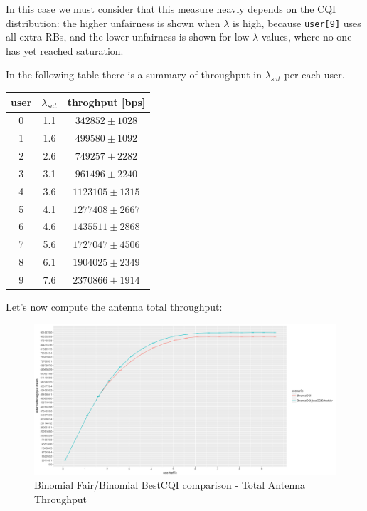 In this case we must consider that this measure heavly depends on the CQI distribution: the higher unfairness is shown when \(\lambda\) is high, because \texttt{user[9]} uses all extra RBs, and the lower unfairness is shown for low \(\lambda\) values, where no one has yet reached saturation.

In the following table there is a summary of throughput in \(\lambda_{sat}\) per each user.
\begin{center}
	\begin{tabular}{|c | c | c|}
	\hline
	 \textbf{user}  & \textbf{\(\lambda_{sat}\)}  & \textbf{throghput [bps]} \\ \hline
	 0 & 1.1 & $342852 \pm 1028$ \\ \hline
	 1 & 1.6 & $499580 \pm 1092$\\ \hline
	 2 & 2.6 & $749257 \pm 2282$\\ \hline
	 3 & 3.1 & $961496 \pm 2240$\\ \hline
	 4 & 3.6 & $1123105 \pm 1315$\\ \hline
	 5 & 4.1 & $1277408 \pm 2667$ \\ \hline
	 6 & 4.6 & $1435511 \pm 2868$\\ \hline
	 7 & 5.6 & $1727047 \pm 4506$ \\ \hline
	 8 & 6.1 & $1904025 \pm 2349$ \\ \hline
	 9 & 7.6 & $2370866 \pm 1914$ \\ \hline
	\end{tabular}
\end{center}


Let's now compute the antenna total throughput:
\begin{figure}[H]
  \includegraphics[width=1\textwidth]{images/thantenna-2.png}
  \caption{Binomial Fair/Binomial BestCQI comparison - Total Antenna Throughput}
  \label{fig:thantenna-2}
\end{figure}

